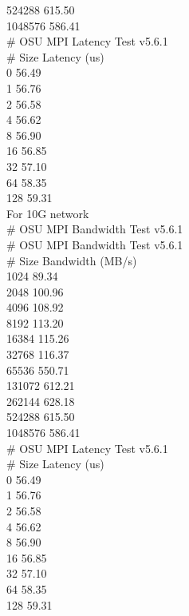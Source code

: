 524288                615.50 \\
1048576               586.41 \\
\newline
\# OSU MPI Latency Test v5.6.1 \\
\# Size          Latency (us) \\
0                      56.49 \\
1                      56.76 \\
2                      56.58 \\
4                      56.62 \\
8                      56.90 \\
16                     56.85 \\
32                     57.10 \\
64                     58.35 \\
128                    59.31 \\
\newline
For 10G network \\
\newline
\# OSU MPI Bandwidth Test v5.6.1 \\
\# OSU MPI Bandwidth Test v5.6.1 \\
\# Size      Bandwidth (MB/s) \\
1024                   89.34 \\
2048                  100.96 \\
4096                  108.92 \\
8192                  113.20 \\
16384                 115.26 \\
32768                 116.37 \\
65536                 550.71 \\
131072                612.21 \\
262144                628.18 \\
524288                615.50 \\
1048576               586.41 \\
\# OSU MPI Latency Test v5.6.1 \\
\# Size          Latency (us) \\
0                      56.49 \\
1                      56.76 \\
2                      56.58 \\
4                      56.62 \\
8                      56.90 \\
16                     56.85 \\
32                     57.10 \\
64                     58.35 \\
128                    59.31 \\

